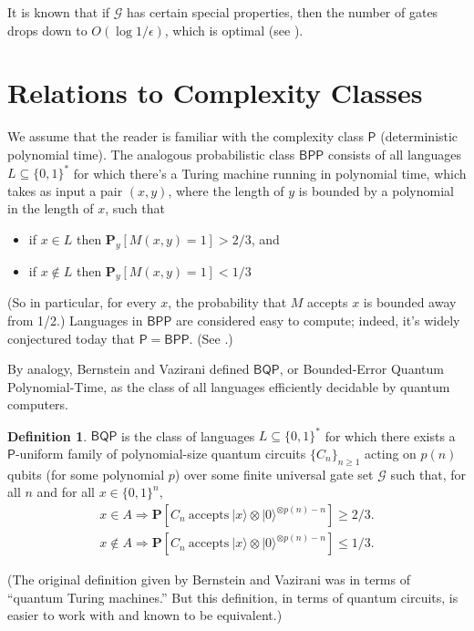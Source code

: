 \documentclass[12pt]{report}
\theoremstyle{plain}
\theoremstyle{definition}
\newtheorem{definition}[theorem]{Definition}
\renewcommand{\Pr}{\mathbf{P}}
\renewcommand{\ket}[1]{|#1\rangle}
\begin{document}
It is known that if $\mathcal{G}$ has certain special properties, then the number of
gates drops down to $O(\log 1/\epsilon)$, which is optimal (see
\cite{HRC02}).



\section{Relations to Complexity Classes}

We assume that the reader is familiar with the complexity class
$\mathsf{P}$ (deterministic polynomial time).  The analogous probabilistic
class $\mathsf{BPP}$ consists of all languages $L\subseteq \{0,1\}^*$ for which there's a
Turing machine running in polynomial time, which takes as input a pair
$(x,y)$, where the length of $y$ is bounded by a polynomial in the length
of $x$, such that
\begin{itemize}
\item if $x \in L$ then $\Pr_y[M(x,y)=1] > 2/3$, and
\item if $x \not\in L$ then $\Pr_y[M(x,y)=1] < 1/3$
\end{itemize}
(So in particular, for every $x$, the probability that $M$ accepts $x$ is bounded away from 1/2.)
Languages in $\mathsf{BPP}$ are considered easy to compute; indeed, it's
widely conjectured today that $\mathsf{P} = \mathsf{BPP}$.  (See \cite{IW97}.)

By analogy, Bernstein and Vazirani \cite{bv} defined $\mathsf{BQP}$, or Bounded-Error Quantum Polynomial-Time, as the class of all languages efficiently decidable by quantum computers.

\begin{definition}
$\mathsf{BQP}$ is the class of languages $L \subseteq \{0,1\}^*$ for which there
exists a $\mathsf{P}$-uniform family of polynomial-size quantum circuits $\{C_n\}_{n \geq 1}$
acting on $p(n)$ qubits (for some polynomial $p$) over some finite universal
gate set $\mathcal{G}$ such that, for all $n$ and for all $x \in \{0,1\}^n,$
\begin{eqnarray*}
x \in A \Longrightarrow \Pr[C_n\ \mbox{accepts}\  \ket{x}\otimes  \ket{0}^{\otimes p(n)-n}] \geq 2/3.\\
x \not\in A \Longrightarrow \Pr[C_n\ \mbox{accepts}\  \ket{x}\otimes  \ket{0}^{\otimes p(n)-n}] \leq 1/3.
\end{eqnarray*}
\end{definition}

(The original definition given by Bernstein and Vazirani was in terms of
``quantum Turing machines.''  But this definition, in terms of quantum circuits, is easier to work with and known to be equivalent.)
\end{document}

